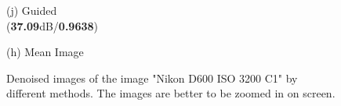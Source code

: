 \documentclass[10pt,twocolumn,letterpaper]{article}
\begin{document}
\begin{figure}
{\begin{minipage}[t]{0.195\textwidth}
{\footnotesize (j) Guided \\ (\textbf{37.09}dB/\textbf{0.9638})}
\end{minipage}
\begin{minipage}[t]{0.195\textwidth}
\centering
{}
{\footnotesize (h) Mean Image }
\end{minipage}
}
\caption{Denoised images of the image "Nikon D600 ISO 3200 C1" by different methods. The images are better to be zoomed in on screen.}
\end{figure}
\end{document}
